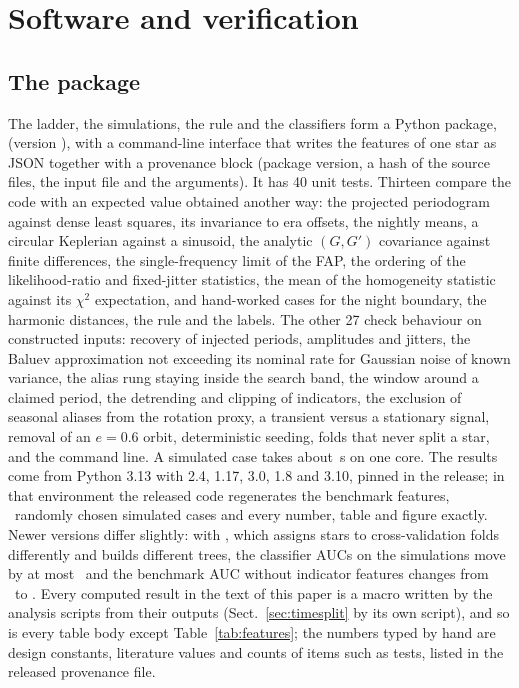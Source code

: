 \section{Software and verification}
\label{sec:verify}

\subsection{The package}

The ladder, the simulations, the rule and the classifiers form a Python package,
 (version \nmrvvetVersion), with a command-line interface that writes the
features of one star as JSON together with a provenance block (package version, a
hash of the source files, the input file and the arguments). It has 40 unit tests.
Thirteen compare the code with an expected value obtained another way: the projected
periodogram against dense least squares, its invariance to era offsets, the nightly
means, a circular Keplerian against a sinusoid, the analytic $(G, G')$ covariance
against finite differences, the single-frequency limit of the FAP, the ordering of the
likelihood-ratio and fixed-jitter statistics, the mean of the homogeneity statistic against
its $\chi^2$ expectation, and hand-worked cases for the night boundary, the harmonic
distances, the rule and the labels. The other 27 check behaviour on constructed
inputs: recovery of injected periods, amplitudes and jitters, the Baluev approximation not
exceeding its nominal rate for Gaussian noise of known variance, the alias rung staying
inside the search band, the window around a claimed period, the detrending and clipping of
indicators, the exclusion of seasonal aliases from the rotation proxy, a transient versus
a stationary signal, removal of an $e = 0.6$ orbit, deterministic seeding, folds that
never split a star, and the command line. A simulated case takes about
\nmSecPerCase\,s on one core. The results come from Python 3.13 with  2.4,
 1.17,  3.0,  1.8 and  3.10, pinned
in the release; in that environment the released code regenerates the benchmark features,
\nmConsistN\ randomly chosen simulated cases and every number, table and figure exactly. Newer versions differ slightly: with
 \nmVerOther, which assigns stars to cross-validation folds differently and
builds different trees, the classifier AUCs on the simulations move by at most \nmVerAucMax\ and
the benchmark AUC without indicator features changes from \nmVerBNoIndPaper\ to
\nmVerBNoIndOther. Every computed result in the text of this paper is a macro written by the
analysis scripts from their outputs (Sect.~\ref{sec:timesplit} by its own script), and so is
every table body except Table~\ref{tab:features}; the numbers typed by hand are design constants, literature values
and counts of items such as tests, listed in the released provenance file.

